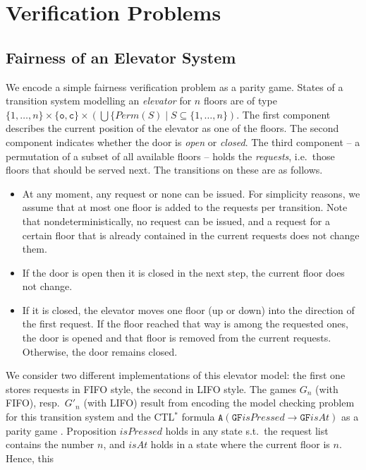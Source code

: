 \section{Verification Problems}

\subsection{Fairness of an Elevator System}

We encode a simple fairness verification problem as a parity game. States of a transition system modelling
an \emph{elevator} for $n$ floors are of type
$\{1,\ldots,n\} \times \{\mathtt{o},\mathtt{c}\} \times (\bigcup \{ \mathit{Perm}(S) \mid S \subseteq \{1,\ldots,n\})$.
The first component describes the current position of the elevator as one of the floors. The
second component indicates whether the door is \emph{open} or \emph{closed}. The third component -- a permutation
of a subset of all available floors -- holds the \emph{requests}, i.e.\ those floors that should be served next.
The transitions on these are as follows.
\begin{itemize}
\item At any moment, any request or none can be issued. For simplicity reasons, we assume that at most one floor
      is added to the requests per transition. Note that nondeterministically, no request can be issued, and a
      request for a certain floor that is already contained in the current requests does not change them.
\item If the door is open then it is closed in the next step, the current floor does not change.
\item If it is closed, the elevator moves one floor (up or down) into the direction of the first request. If the
      floor reached that way is among the requested ones, the door is opened and that floor is removed from the
      current requests. Otherwise, the door remains closed.
\end{itemize}
We consider two different implementations of this elevator model: the first one stores requests in FIFO
style, the second in LIFO style. The games $G_n$ (with FIFO), resp.\ $G'_n$ (with LIFO) result from
encoding the model checking problem for this transition system and the CTL$^*$ formula
$\mathtt{A}(\mathtt{GF}\mathit{isPressed} \to \mathtt{GF}\mathit{isAt})$ as a parity game
\cite{Stirling95}.  Proposition $\mathit{isPressed}$ holds in any state s.t.\ the request list contains
the number $n$, and $\mathit{isAt}$ holds in a state where the current floor is $n$. Hence, this
